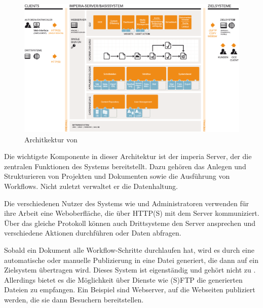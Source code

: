            \begin{figure}
                \centering
                \includegraphics[width=\textwidth]{../resources/imperia/architektur.png}
                \caption{Architkektur von {\imperia} \cite{imperia:ecmd}}
                \label{image:imperiaArchitektur}
            \end{figure}

            Die wichtigste Komponente in dieser Architektur ist der imperia Server,
            der die zentralen Funktionen des Systems bereitstellt.
            Dazu gehören das Anlegen und Strukturieren von Projekten
            und Dokumenten sowie die Ausführung von Workflows.
            Nicht zuletzt verwaltet er die Datenhaltung.

            Die verschiedenen Nutzer des Systems wie {\editors} und Administratoren
            verwenden für ihre Arbeit eine Weboberfläche,
            die über HTTP(S) mit dem Server kommuniziert.
            Über das gleiche Protokoll können auch Drittsysteme den Server
            ansprechen und verschiedene Aktionen durchführen oder Daten abfragen.

            Sobald ein Dokument alle Workflow-Schritte durchlaufen hat,
            wird es durch eine automatische oder manuelle Publizierung
            in eine Datei generiert, die dann auf ein Zielsystem übertragen wird.
            Dieses System ist eigenständig und gehört nicht zu {\imperia}.
            Allerdings bietet es die Möglichkeit über Dienste wie (S)FTP
            die generierten Dateien zu empfangen.
            Ein Beispiel sind Webserver, auf die Webseiten publiziert werden,
            die sie dann Besuchern bereitstellen.

    \section{\wordpress}
